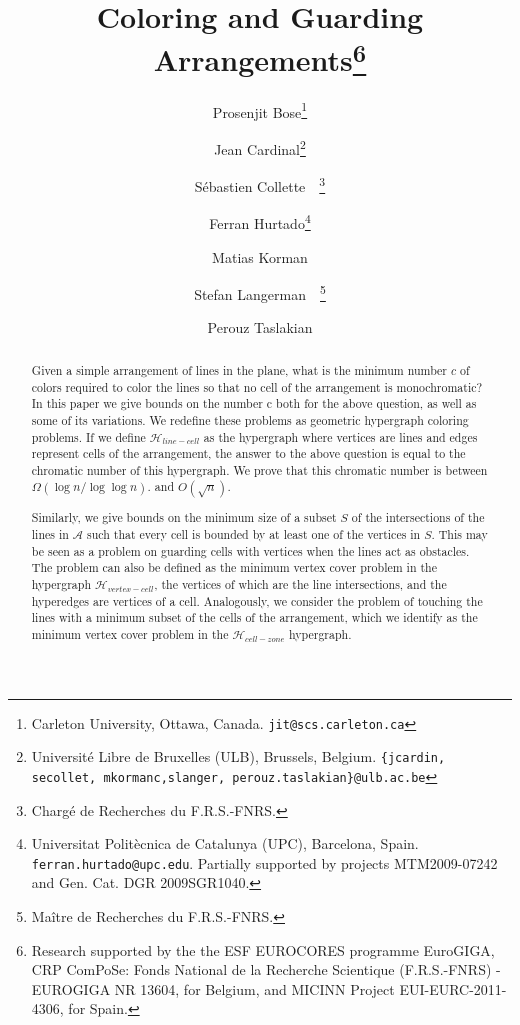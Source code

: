 \documentclass[11pt,a4paper]{article}
\title{Coloring and Guarding Arrangements\thanks{Research supported by the the ESF EUROCORES programme EuroGIGA, CRP ComPoSe: Fonds National de la Recherche Scientique (F.R.S.-FNRS) - EUROGIGA NR 13604, for Belgium, and MICINN Project EUI-EURC-2011-4306, for Spain.}}
\author{Prosenjit Bose\thanks{Carleton University, Ottawa, Canada. \tt{jit@scs.carleton.ca}}
\and Jean Cardinal\thanks{Universit\'e Libre de Bruxelles (ULB), Brussels, Belgium. \tt{\{jcardin, secollet, mkormanc,slanger, perouz.taslakian\}@ulb.ac.be}} 
\and S\'ebastien Collette\footnotemark[3]~~\thanks{Charg\'e de Recherches du F.R.S.-FNRS.}  
\and Ferran Hurtado\thanks{Universitat Polit\`{e}cnica de Catalunya (UPC), Barcelona, Spain.
 {\tt ferran.hurtado@upc.edu}. Partially supported by projects MTM2009-07242 and Gen. Cat. DGR 2009SGR1040.} 
  \and Matias Korman\footnotemark[3]
  \and Stefan Langerman\footnotemark[3]~~\thanks{Ma\^itre de Recherches du F.R.S.-FNRS.} 
  \and Perouz Taslakian\footnotemark[3]}
\newcommand{\Hlinecell}{{\mathcal H}_{line-cell}}
\newcommand{\Hvertexcell}{{\mathcal H}_{vertex-cell}}
\newcommand{\Hcellzone}{{\mathcal H}_{cell-zone}}
\newcommand{\sholong}[2]{#2}
\begin{document}
\maketitle

\begin{abstract}
Given a simple arrangement of lines in the plane, what is the minimum number $c$ of colors required to color the lines so that no cell of the arrangement is monochromatic? In this paper we give bounds on the number c both for the above question, as well as some of its variations. We redefine these problems as geometric hypergraph coloring problems. If we define $\Hlinecell$ as the hypergraph where vertices are lines and edges represent cells of the arrangement, the answer to the above question is equal to the chromatic number of this hypergraph. We prove that this chromatic number is between $\Omega (\log n / \log\log n)$. and $O(\sqrt{n})$.

Similarly, we give bounds on the minimum size of a subset $S$ of the intersections of the lines in $\mathcal{A}$ such that every cell is bounded by at least one of the vertices in $S$. This may be seen as a problem on guarding cells with vertices when the lines act as obstacles. The problem can also be defined as the minimum vertex cover problem in the hypergraph $\Hvertexcell$, the vertices of which are the line intersections, and the hyperedges are vertices of a cell. Analogously, we consider the problem of touching the lines with a minimum subset of the cells of the arrangement, which we identify as the minimum vertex cover problem in the $\Hcellzone$ hypergraph.



\end{abstract}
\sholong{\newpage}{}
\end{document}
